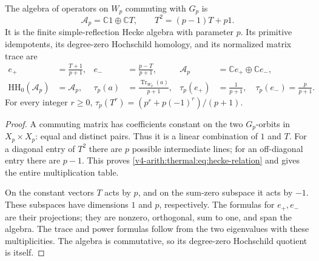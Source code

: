\begin{proposition}
\label{v4-arith:thermal:prop:finite-hecke}
The algebra of operators on $W_p$ commuting with $G_p$ is
\begin{equation}
 \mathcal A_p=\mathbb C1\oplus\mathbb CT,
 \qquad T^2=(p-1)T+p1.
 \label{v4-arith:thermal:eq:hecke-relation}
\end{equation}
It is the finite simple-reflection Hecke algebra with parameter $p$.
Its primitive idempotents, its degree-zero Hochschild homology,
and its normalized matrix trace are
\begin{align}
 e_+&=\frac{T+1}{p+1},&e_-&=\frac{p-T}{p+1},
       &\mathcal A_p&=\mathbb Ce_+\oplus\mathbb Ce_-,\\
 \mathrm{HH}_0(\mathcal A_p)&=\mathcal A_p,
       &\tau_p(a)&=\frac{\operatorname{Tr}_{W_p}(a)}{p+1},
       &\tau_p(e_+)&=\frac1{p+1},\quad
         \tau_p(e_-)=\frac p{p+1}.
 \label{v4-arith:thermal:eq:hecke-trace}
\end{align}
For every integer $r\geq0$,
$\tau_p(T^r)=(p^r+p(-1)^r)/(p+1)$.
\end{proposition}

\begin{proof}
A commuting matrix has coefficients constant on the two $G_p$-orbits
in $X_p\times X_p$: equal and distinct pairs. Thus it is a linear
combination of $1$ and $T$. For a diagonal entry of $T^2$ there
are $p$ possible intermediate lines; for an off-diagonal entry
there are $p-1$. This proves \eqref{v4-arith:thermal:eq:hecke-relation} and gives
the entire multiplication table.

On the constant vectors $T$ acts by $p$, and on the sum-zero
subspace it acts by $-1$. These subspaces have dimensions $1$
and $p$, respectively. The formulas for $e_+,e_-$ are their
projections; they are nonzero, orthogonal, sum to one, and span
the algebra. The trace and power formulas follow from the two
eigenvalues with these multiplicities. The algebra is commutative,
so its degree-zero Hochschild quotient is itself.
\end{proof}

